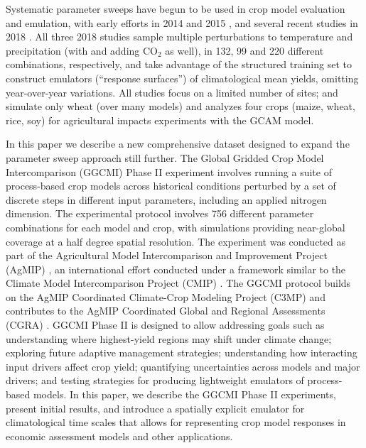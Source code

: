 \documentclass[gmd, manuscript]{copernicus} %
\begin{document}
Systematic parameter sweeps have begun to be used in crop model evaluation and emulation, with early efforts in 2014 and 2015 \citep{ruane2014, Markowski2015, Pirttioja2015}, and several recent studies in 2018 \citep{FRONZEK20182, Snyder2018, RUIZRAMOS2018}. All three 2018 studies sample multiple perturbations to temperature and precipitation (with \citet{Snyder2018} and \citet{RUIZRAMOS2018} adding CO$_2$ as well), in 132, 99 and 220 different combinations, respectively, and take advantage of the structured training set to construct emulators (``response surfaces'') of climatological mean yields, omitting year-over-year variations. All studies focus on a limited number of sites; \citet{FRONZEK20182} and \citet{RUIZRAMOS2018} simulate only wheat (over many models) and \citet{Snyder2018} analyzes four crops (maize, wheat, rice, soy) for agricultural impacts experiments with the GCAM \citep{calvin2019} model.

In this paper we describe a new comprehensive dataset designed to expand the parameter sweep approach still further. The Global Gridded Crop Model Intercomparison (GGCMI) Phase II experiment involves running a suite of process-based crop models across historical conditions perturbed by a set of discrete steps in different input parameters, including an applied nitrogen dimension. The experimental protocol involves 756 different parameter combinations for each model and crop, with simulations providing near-global coverage at a half degree spatial resolution. The experiment was conducted as part of the Agricultural Model Intercomparison and Improvement Project (AgMIP) \citep{ROSENZWEIG2013, Rosenzweig2014}, an international effort conducted under a framework similar to the Climate Model Intercomparison Project (CMIP) \citep{Taylor2012, Eyring2016}. The GGCMI protocol builds on the AgMIP Coordinated Climate-Crop Modeling Project (C3MP) \citep{ruane2014, mcdermid2015} and contributes to the AgMIP Coordinated Global and Regional Assessments (CGRA) \citep{ruane2018, rosenzweig2018}. GGCMI Phase II is designed to allow addressing goals such as understanding where highest-yield regions may shift under climate change; exploring future adaptive management strategies; understanding how interacting input drivers affect crop yield; quantifying uncertainties across models and major drivers; and testing strategies for producing lightweight emulators of process-based models. In this paper, we describe the GGCMI Phase II experiments, present initial results, and introduce a spatially explicit emulator for climatological time scales that allows for representing crop model responses in economic assessment models and other applications.
\end{document}
